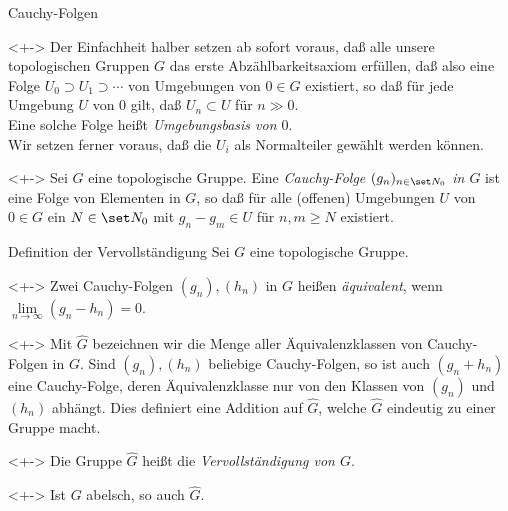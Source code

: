 \begin{frame}{Cauchy-Folgen}
	\begin{visibleenv}<+->
		Der Einfachheit halber setzen ab sofort voraus, daß alle unsere topologischen Gruppen \(G\) das
		erste Abzählbarkeitsaxiom erfüllen, daß also eine Folge \(U_0 \supset U_1 \supset \dotsb\)
		von Umgebungen von \(0 \in G\) existiert, so daß für jede
		Umgebung \(U\) von \(0\) gilt, daß \(U_n \subset U\) für \(n \gg 0\).
		\\
		Eine solche Folge heißt \emph{Umgebungsbasis von \(0\)}.
		\\
		Wir setzen ferner voraus, daß die $U_i$ als Normalteiler gewählt werden können.
	\end{visibleenv}
	\begin{definition}<+->
		Sei \(G\) eine topologische Gruppe. Eine \emph{Cauchy-Folge \((g_n)_{n \in \set N_0}\) in \(G\)}
		ist eine Folge von Elementen in \(G\), so daß für alle (offenen) Umgebungen \(U\) von \(0 \in G\)
		ein \(N \in \set N_0\) mit \(g_n - g_m \in U\) für \(n, m \ge N\) existiert.
	\end{definition}
\end{frame}

\begin{frame}{Definition der Vervollständigung}
	Sei \(G\) eine topologische Gruppe.
	\begin{definition}<+->
		Zwei Cauchy-Folgen \((g_n), (h_n)\) in \(G\) heißen
		\emph{äquivalent}, wenn \(\lim\limits_{n \to \infty} (g_n - h_n) = 0\).
	\end{definition}
	\begin{visibleenv}<+->
		Mit \(\hat G\) bezeichnen wir die Menge aller Äquivalenzklassen von Cauchy-Folgen in \(G\).
		Sind \((g_n), (h_n)\) beliebige Cauchy-Folgen, so ist auch \((g_n + h_n)\) eine Cauchy-Folge, deren
		Äquivalenzklasse nur von den Klassen von \((g_n)\) und \((h_n)\) abhängt. Dies definiert eine
		Addition auf \(\hat G\), welche \(\hat G\) eindeutig zu einer Gruppe macht.
	\end{visibleenv}
	\begin{definition}<+->
		Die Gruppe \(\hat G\) heißt die \emph{Vervollständigung von \(G\)}.
	\end{definition}
	\begin{remark}<+->
		Ist \(G\) abelsch, so auch \(\hat G\).
	\end{remark}
\end{frame}

